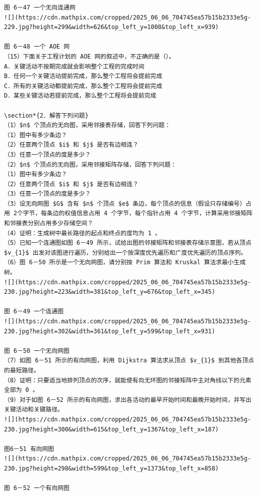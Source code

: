 \documentclass[10pt]{article}
\begin{document}
\begin{verbatim}
图 6－47 一个无向连通网
![](https://cdn.mathpix.com/cropped/2025_06_06_704745ea57b15b2333e5g-229.jpg?height=299&width=626&top_left_y=1008&top_left_x=939)

图 6－48 一个 AOE 网
（15）下面关于工程计划的 AOE 网的叙述中，不正确的是（）。
A．关键活动不按期完成就会影响整个工程的完成时间
B．任何一个关键活动提前完成，那么整个工程将会提前完成
C．所有的关键活动都提前完成，那么整个工程将会提前完成
D．某些关键活动若提前完成，那么整个工程将会提前完成

\section*{2．解答下列问题}
（1）$n$ 个顶点的无向图，采用邻接表存储，回答下列问题：
（1）图中有多少条边？
（2）任意两个顶点 $i$ 和 $j$ 是否有边相连？
（3）任意一个顶点的度是多少？
（2）$n$ 个顶点的无向图，采用邻接矩阵存储，回答下列问题：
（1）图中有多少条边？
（2）任意两个顶点 $i$ 和 $j$ 是否有边相连？
（3）任意一个顶点的度是多少？
（3）设无向网图 $G$ 含有 $n$ 个顶点 $e$ 条边，每个顶点的信息（假设只存储编号）占用 2个字节，每条边的权值信息占用 4 个字节，每个指针占用 4 个字节，计算采用邻接矩阵和邻接表分别占用多少存储空间？
（4）证明：生成树中最长路径的起点和终点的度均为 1 。
（5）已知一个连通图如图 6－49 所示，试给出图的邻接矩阵和邻接表存储示意图，若从顶点 $v_{1}$ 出发对该图进行遍历，分别给出一个按深度优先遍历和广度优先遍历的顶点序列。
（6）图 6－50 所示是一个无向网图，请分别按 Prim 算法和 Kruskal 算法求最小生成树。
![](https://cdn.mathpix.com/cropped/2025_06_06_704745ea57b15b2333e5g-230.jpg?height=223&width=381&top_left_y=676&top_left_x=345)

图 6－49 一个连通图
![](https://cdn.mathpix.com/cropped/2025_06_06_704745ea57b15b2333e5g-230.jpg?height=302&width=361&top_left_y=599&top_left_x=931)

图 6－50 一个无向网图
（7）如图 6－51 所示的有向网图，利用 Dijkstra 算法求从顶点 $v_{1}$ 到其他各顶点的最短路径。
（8）证明：只要适当地排列顶点的次序，就能使有向无环图的邻接矩阵中主对角线以下的元素全部为 0 。
（9）对于如图 6－52 所示的有向网图，求出各活动的最早开始时间和最晚开始时间，并写出关键活动和关键路径。
![](https://cdn.mathpix.com/cropped/2025_06_06_704745ea57b15b2333e5g-230.jpg?height=300&width=615&top_left_y=1367&top_left_x=187)

图6－51 有向网图
![](https://cdn.mathpix.com/cropped/2025_06_06_704745ea57b15b2333e5g-230.jpg?height=298&width=599&top_left_y=1373&top_left_x=858)

图 6－52 一个有向网图


\end{verbatim}
\end{document}
